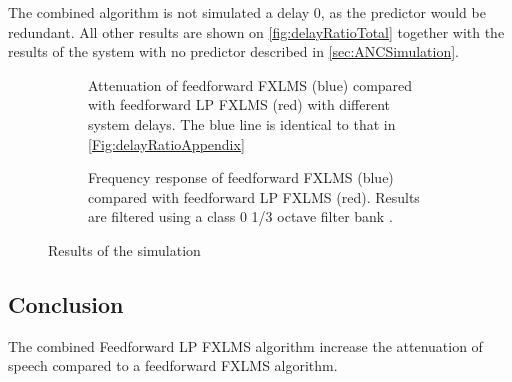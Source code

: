 The combined algorithm is not simulated a delay 0, as the predictor would be redundant. All other results are shown on \autoref{fig:delayRatioTotal} together with the results of the system with no predictor described in \autoref{sec:ANCSimulation}.
\begin{figure}[H]
	\centering
		\hspace{-20mm}
	\begin{subfigure}[b]{0.40\textwidth}
	\centering
		
		\caption{ Attenuation of feedforward FXLMS (blue) compared with feedforward LP FXLMS (red) with different system delays. The blue line is identical to that in \autoref{Fig:delayRatioAppendix}}
		\label{fig:delayRatioTotal}
	\end{subfigure}
	\hspace{20mm}
	\begin{subfigure}[b]{0.40\textwidth}
	\centering
	
	\caption{Frequency response of feedforward FXLMS (blue) compared with feedforward LP FXLMS (red). Results are filtered using a class 0 1/3 octave filter bank \cite{OctaveBand}.}
	\label{fig:ANCcompareALLAppendix}
	\end{subfigure}	
	\caption{Results of the simulation}	
\end{figure}



\subsection{Conclusion}
The combined Feedforward LP FXLMS algorithm increase the attenuation of speech compared to a feedforward FXLMS algorithm. 
